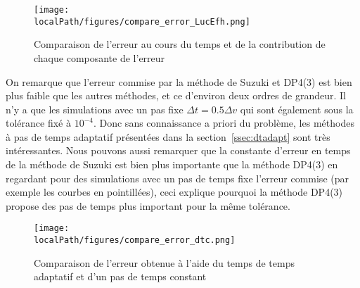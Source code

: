 \begin{figure}[h]
  \centering
  \texttt{[image: \\localPath/figures/compare\_error\_LucEfh.png]}
  \caption{Comparaison de l'erreur au cours du temps et de la contribution de chaque composante de l'erreur}
  \label{fig:compare:error:LucEfh}
\end{figure}

On remarque que l'erreur commise par la méthode de Suzuki et DP4(3) est bien plus faible que les autres méthodes, et ce d'environ deux ordres de grandeur. Il n'y a que les simulations avec un pas fixe $\Delta t = 0.5\Delta v$ qui sont également sous la tolérance  fixé à $10^{-4}$. Donc sans connaissance a priori du problème, les méthodes à pas de temps adaptatif présentées dans la section~\ref{ssec:dtadapt} sont très intéressantes. Nous pouvons aussi remarquer que la constante d'erreur en temps de la méthode de Suzuki est bien plus importante que la méthode DP4(3) en regardant pour des simulations avec un pas de temps fixe l'erreur commise (par exemple les courbes en pointillées), ceci explique pourquoi la méthode DP4(3) propose des pas de temps plus important pour la même tolérance.

\begin{figure}[h]
  \centering
  \texttt{[image: \\localPath/figures/compare\_error\_dtc.png]}
  \caption{Comparaison de l'erreur obtenue à l'aide du temps de temps adaptatif et d'un pas de temps constant}
  \label{fig:compare:error:dtc}
\end{figure}



